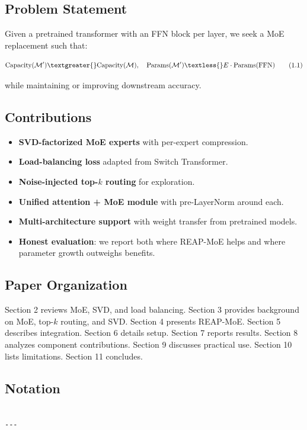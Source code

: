 \subsection{Problem Statement}

Given a pretrained transformer with an FFN block per layer, we seek a MoE 
replacement such that:

\[
\text{Capacity}(\mathcal{M}') \textgreater{} \text{Capacity}(\mathcal{M}), \quad
\text{Params}(\mathcal{M}') \textless{} E \cdot \text{Params}(\text{FFN})
\tag{1.1}
\]

while maintaining or improving downstream accuracy.

\subsection{Contributions}

\begin{itemize}
\item \textbf{SVD-factorized MoE experts} with per-expert compression.
\item \textbf{Load-balancing loss} adapted from Switch Transformer.
\item \textbf{Noise-injected top-$k$ routing} for exploration.
\item \textbf{Unified attention + MoE module} with pre-LayerNorm around each.
\item \textbf{Multi-architecture support} with weight transfer from pretrained models.
\item \textbf{Honest evaluation}: we report both where REAP-MoE helps and where
  parameter growth outweighs benefits.

\end{itemize}
\subsection{Paper Organization}

Section 2 reviews MoE, SVD, and load balancing. Section 3 provides background 
on MoE, top-$k$ routing, and SVD. Section 4 presents REAP-MoE. Section 5 
describes integration. Section 6 details setup. Section 7 reports results. 
Section 8 analyzes component contributions. Section 9 discusses practical 
use. Section 10 lists limitations. Section 11 concludes.



\subsection{Notation}

\begin{lstlisting}

---
\end{lstlisting}
